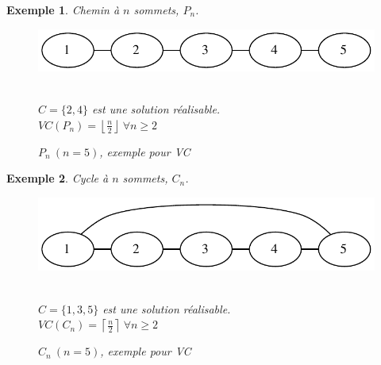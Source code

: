 \documentclass{article}
\newcommand{\ceil}[1]{\left\lceil #1 \right\rceil}
\newcommand{\cdil}[1]{\left\lfloor #1 \right\rfloor}
\newtheorem{exemple}{Exemple}[section]
\begin{document}
\begin{sffamily}
\begin{exemple}
Chemin à $n$ sommets, $P_n$.\\
\begin{figure}[h!]
    \begin{center}
    \includegraphics[scale=0.5]{pn.pdf}
    \caption{$P_n\ (n=5)$, exemple pour VC}
    $ $ \\
	$C = \{2,4\}$ est une solution réalisable. \\
	$VC(P_n)=\cdil{\frac{n}{2}}\ \forall n \geq 2$
    \end{center}	
\end{figure}
\end{exemple}

\begin{exemple}
Cycle à $n$ sommets, $C_n$.\\
\begin{figure}[h!]
    \begin{center}
    \includegraphics[scale=0.5]{cn.pdf}
    \caption{$C_n\ (n=5)$, exemple pour VC}
    $ $ \\
	$C = \{1,3,5\}$ est une solution réalisable. \\
	$VC(C_n)=\ceil{\frac{n}{2}}\ \forall n \geq 2$
    \end{center}	
\end{figure}
\end{exemple}

\newpage


\end{sffamily}
\end{document}
